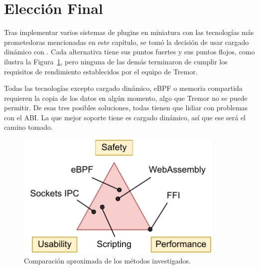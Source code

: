 \section{Elección Final}

Tras implementar varios sistemas de plugins en miniatura con las tecnologías más
prometedoras mencionadas en este capítulo, se tomó la decisión de usar cargado
dinámico con . Cada alternativa tiene sus puntos fuertes y sus
puntos flojos, como ilustra la Figura~\ref{fig:triangle}, pero ninguna de las
demás terminaron de cumplir los requisitos de rendimiento establecidos por el
equipo de Tremor.

Todas las tecnologías excepto cargado dinámico, eBPF o memoria compartida
requieren la copia de los datos en algún momento, algo que Tremor no se puede
permitir. De esas tres posibles soluciones, todas tienen que lidiar con
problemas con el ABI. La que mejor soporte tiene es cargado dinámico, así que
ese será el camino tomado.

\begin{figure}
    \centering
    \includegraphics[width=10cm]{./Imagenes/triangle.pdf}
    \caption{Comparación aproximada de los métodos investigados.}%
    \label{fig:triangle}
\end{figure}
